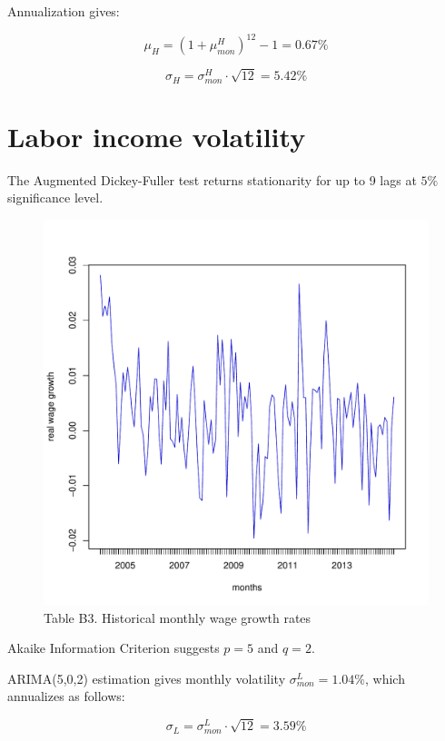 Annualization gives:

\begin{equation}
	\mu_H = (1 + \mu^H_{mon})^{12} - 1= 0.67\%
\end{equation}

\begin{equation}
	\sigma_H = \sigma^H_{mon} \cdot \sqrt{12} = 5.42 \%
\end{equation}


\section{Labor income volatility}
\label{paramcalibz}
The Augmented Dickey-Fuller test returns stationarity for up to 9 lags at $5\%$ significance level. 

\begin{figure}[h!]
	\centering
	\includegraphics[scale=0.3]{figs/wagediff.pdf}
	\caption*{Table B3. Historical monthly wage growth rates}
	\label{fig:wagediff}
\end{figure}

Akaike Information Criterion suggests $p=5$ and $q=2$.

ARIMA(5,0,2) estimation gives monthly volatility $\sigma^L_{mon} = 1.04\%$, which annualizes as follows:

\begin{equation}
	\sigma_L = \sigma^L_{mon} \cdot \sqrt{12} = 3.59 \%
\end{equation}


